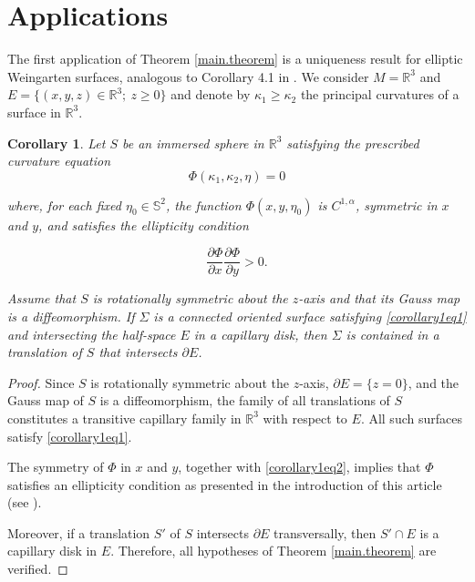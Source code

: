 \documentclass[11pt,reqno]{amsart}
\newtheorem{corollary}{Corollary}[theorem] %
\begin{document}
\section{Applications}

The first application of Theorem \ref{main.theorem} is a uniqueness result for elliptic Weingarten surfaces, analogous to Corollary 4.1 in \cite{Galvez-Mira-Uniqueness}. We consider $M=\mathbb{R}^3$ and $E=\{(x,y,z)\in\mathbb{R}^3;\ z\geq0\}$ and denote by $\kappa_1\geq\kappa_2$ the principal curvatures of a surface in $\mathbb{R}^3$.

\begin{corollary}
    Let $S$ be an immersed sphere in $\mathbb{R}^3$ satisfying the prescribed curvature equation
    \begin{equation}\label{corollary1eq1}
    \Phi(\kappa_1,\kappa_2,\eta)=0
    \end{equation}
    
    where, for each fixed $\eta_0\in \mathbb{S}^2$, the function $\Phi(x,y,\eta_0)$ is $C^{1,\alpha}$, symmetric in $x$ and $y$, and satisfies the ellipticity condition
    
    \begin{equation}\label{corollary1eq2}
    \frac{\partial\Phi}{\partial x}\frac{\partial\Phi}{\partial y}>0.
    \end{equation}
    
    Assume that $S$ is rotationally symmetric about the $z$-axis and that its Gauss map is a diffeomorphism. If $\Sigma$ is a connected oriented surface satisfying \eqref{corollary1eq1} and intersecting the half-space $E$ in a capillary disk, then $\Sigma$ is contained in a translation of $S$ that intersects $\partial E$.
\end{corollary}


\begin{proof}
    Since $S$ is rotationally symmetric about the $z$-axis, $\partial E=\{z=0\}$, and the Gauss map of $S$ is a diffeomorphism, the family of all translations of $S$ constitutes a transitive capillary family in $\mathbb{R}^3$ with respect to $E$. All such surfaces satisfy \eqref{corollary1eq1}. 
    
    The symmetry of $\Phi$ in $x$ and $y$, together with \eqref{corollary1eq2}, implies that $\Phi$ satisfies an ellipticity condition as presented in the introduction of this article (see \cite{Alexandrov1962a}).
    
    Moreover, if a translation $S'$ of $S$ intersects $\partial E$ transversally, then $S'\cap E$ is a capillary disk in $E$. Therefore, all hypotheses of Theorem \ref{main.theorem} are verified.
\end{proof}
\end{document}
